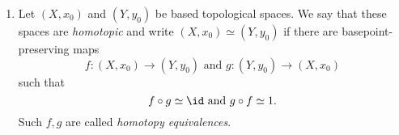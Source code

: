 \documentclass[12pt,letterpaper]{article}
\renewcommand{\inv}[1]{\overline{#1}}
\renewcommand{\phi}{\varphi}
\begin{document}
\begin{enumerate}
\begin{proof}
\begin{itemize}
	\item To see that $\Theta$ is injective, observe that $[f]\in\ker(\Theta)$ means that $f\simeq\omega_0$ which is a constant loop, so $\Theta$ has trivial kernel. 
	\end{itemize}
Thus we have shown that $\pi_1(\mathbb{S}^1)$ is exactly $\Z$, and we are done.
\end{proof}

\item \mbox{}\vspace*{-25pt}
%

\begin{definition*}
Let $(X,x_0)$ and $(Y,y_0)$ be based topological spaces. We say that these spaces are \emph{homotopic} and write $(X,x_0) \simeq  (Y,y_0)$ if there are basepoint-preserving maps 
$$f:(X,x_0)\to (Y,y_0)\text{ and }g:(Y,y_0)\to(X,x_0)$$ 
such that 
$$f\circ g\simeq \id\text{ and }g\circ f\simeq 1.$$
Such $f,g$ are called \emph{homotopy equivalences}. 
\end{definition*}


\end{enumerate}
\end{document}
